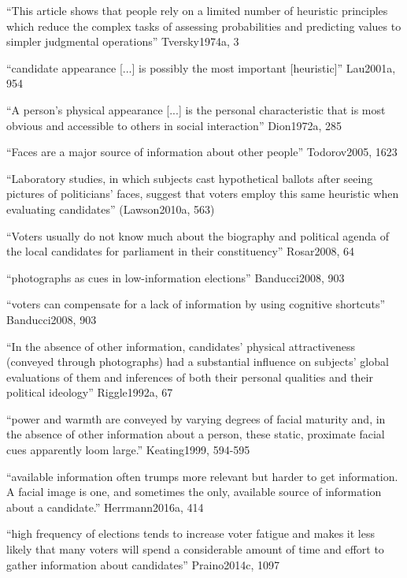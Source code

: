 
		``This article shows that people rely on a limited number of heuristic principles which reduce the complex tasks of assessing probabilities and predicting values to simpler judgmental operations'' Tversky1974a, 3

		``candidate appearance [...] is possibly the most important [heuristic]'' Lau2001a, 954

		``A person's physical appearance [...] is the personal characteristic that is most obvious and accessible to others in social interaction'' Dion1972a, 285

		``Faces are a major source of information about other people'' Todorov2005, 1623

		``Laboratory studies, in which subjects cast hypothetical ballots after seeing pictures of politicians' faces, suggest that voters employ this same heuristic when evaluating candidates'' (Lawson2010a, 563)

		``Voters usually do not know much about the biography and political agenda of the local candidates for parliament in their constituency'' Rosar2008, 64

		``photographs as cues in low-information elections'' Banducci2008, 903

		``voters can compensate for a lack of information by using cognitive shortcuts'' Banducci2008, 903

		``In the absence of other information, candidates' physical attractiveness (conveyed through photographs) had a substantial influence on subjects' global evaluations of them and inferences of both their personal qualities and their political ideology'' Riggle1992a, 67




		
		``power and warmth are conveyed by varying degrees of facial maturity and, in the absence of other information about a person, these static, proximate facial cues apparently loom large.'' Keating1999, 594-595

		``available information often trumps more relevant but harder to get information. A facial image is one, and sometimes the only, available source of information about a candidate.'' Herrmann2016a, 414

		``high frequency of elections tends to increase voter fatigue and makes it less likely that many voters will spend a considerable amount of time and effort to gather information about candidates'' Praino2014c, 1097

